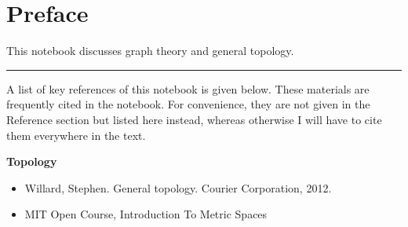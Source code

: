 \chapter*{Preface}

This notebook discusses graph theory and general topology.

\vspace{0.1in}
\noindent \rule{1in}{0.4pt}
\vspace{0.1in}

A list of key references of this notebook is given below. These materials are frequently cited in the notebook. For convenience, they are not given in the Reference section but listed here instead, whereas otherwise I will have to cite them everywhere in the text.

\vspace{0.1in}
\noindent \textbf{Topology}
\vspace{0.1in}

\begin{itemize}
	\item Willard, Stephen. General topology. Courier Corporation, 2012.
	\item MIT Open Course, Introduction To Metric Spaces
\end{itemize}